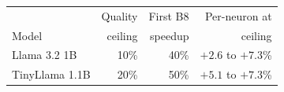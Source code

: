 \begin{tabular}{lrrr}
\toprule
 & Quality & First B8 & Per-neuron at \\
Model & ceiling & speedup & ceiling \\
\midrule
Llama 3.2 1B & 10\% & 40\% & $+2.6$ to $+7.3$\% \\
TinyLlama 1.1B & 20\% & 50\% & $+5.1$ to $+7.3$\% \\
\bottomrule
\end{tabular}

